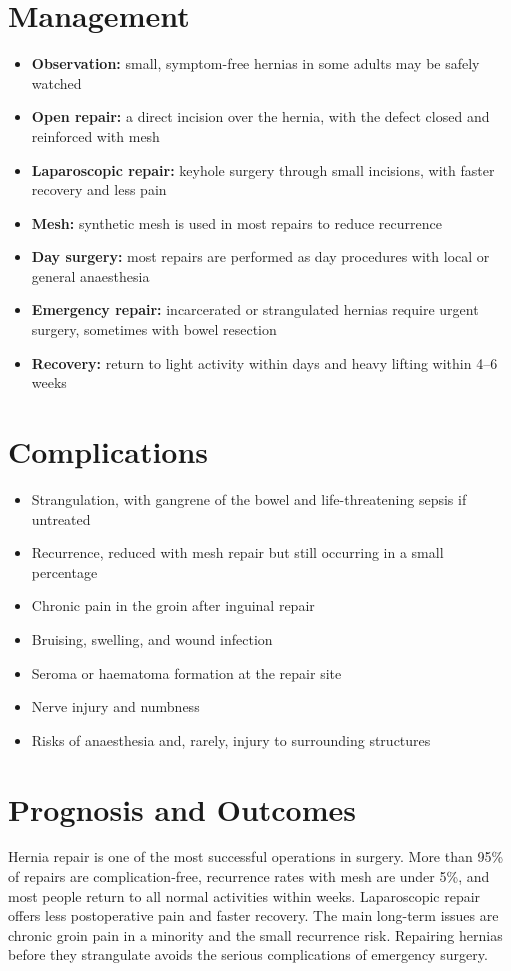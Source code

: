 \section*{Management}
\begin{itemize}
    \item \textbf{Observation:} small, symptom-free hernias in some adults may be safely watched
    \item \textbf{Open repair:} a direct incision over the hernia, with the defect closed and reinforced with mesh
    \item \textbf{Laparoscopic repair:} keyhole surgery through small incisions, with faster recovery and less pain
    \item \textbf{Mesh:} synthetic mesh is used in most repairs to reduce recurrence
    \item \textbf{Day surgery:} most repairs are performed as day procedures with local or general anaesthesia
    \item \textbf{Emergency repair:} incarcerated or strangulated hernias require urgent surgery, sometimes with bowel resection
    \item \textbf{Recovery:} return to light activity within days and heavy lifting within 4--6 weeks
\end{itemize}

\section*{Complications}
\begin{itemize}
    \item Strangulation, with gangrene of the bowel and life-threatening sepsis if untreated
    \item Recurrence, reduced with mesh repair but still occurring in a small percentage
    \item Chronic pain in the groin after inguinal repair
    \item Bruising, swelling, and wound infection
    \item Seroma or haematoma formation at the repair site
    \item Nerve injury and numbness
    \item Risks of anaesthesia and, rarely, injury to surrounding structures
\end{itemize}

\section*{Prognosis and Outcomes}
Hernia repair is one of the most successful operations in surgery. More than 95\% of repairs are complication-free, recurrence rates with mesh are under 5\%, and most people return to all normal activities within weeks. Laparoscopic repair offers less postoperative pain and faster recovery. The main long-term issues are chronic groin pain in a minority and the small recurrence risk. Repairing hernias before they strangulate avoids the serious complications of emergency surgery.

